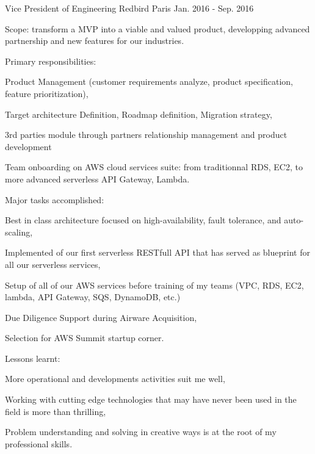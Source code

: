 \begin{cventries}
  \cventry
    {Vice President of Engineering} %
    {Redbird} %
    {Paris} %
    {Jan. 2016 - Sep. 2016} %
    {
      \begin{cvitems} %
        \item {Scope: transform a MVP into a viable and valued product, developping advanced partnership and new features for our industries.}
        \item {Primary responsibilities:} %
        \begin{cvsubitems}
          \item {Product Management (customer requirements analyze, product specification, feature prioritization),}
          \item {Target architecture Definition, Roadmap definition, Migration strategy,}
          \item {3rd parties module through partners relationship management and product development}
          \item {Team onboarding on AWS cloud services suite: from traditionnal RDS, EC2, to more advanced serverless API Gateway, Lambda.}
        \end{cvsubitems}
        \item {Major tasks accomplished:}
        \begin{cvsubitems}
          \item {Best in class architecture focused on high-availability, fault tolerance, and auto-scaling,}
          \item {Implemented of our first serverless RESTfull API that has served as blueprint for all our serverless services,}
          \item {Setup of all of our AWS services before training of my teams (VPC, RDS, EC2, lambda, API Gateway, SQS, DynamoDB, etc.)}
          \item {Due Diligence Support during Airware Acquisition,}
          \item {Selection for AWS Summit startup corner.}
        \end{cvsubitems}
        \item {Lessons learnt:}
        \begin{cvsubitems}
          \item {More operational and developments activities suit me well,}
          \item {Working with cutting edge technologies that may have never been used in the field is more than thrilling,}
          \item {Problem understanding and solving in creative ways is at the root of my professional skills.}
        \end{cvsubitems}
      \end{cvitems}
    }


\end{cventries}

